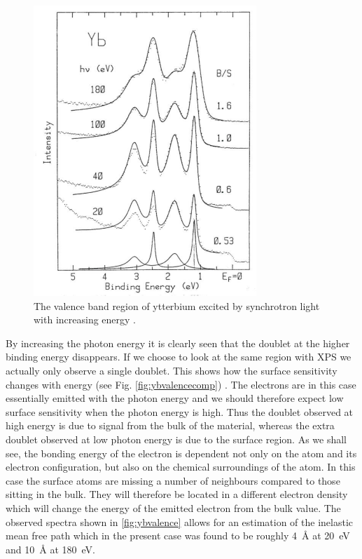 \begin{figure}[h!]
	\begin{center}
	\includegraphics[scale=4]{figures/04_12.png}
	\caption{The valence band region of ytterbium excited by synchrotron light with increasing energy \cite{gerken}.}
	\label{fig:ybvalence}
	\end{center}
\end{figure}

By increasing the photon energy it is clearly seen that the doublet at the higher binding energy disappears. If we choose to look at the same region with XPS we actually only observe a single doublet. This shows how the surface sensitivity changes with energy (see Fig. \ref{fig:ybvalencecomp}) \cite{gerken}. The electrons are in this case essentially emitted with the photon energy and we should therefore expect low surface sensitivity when the photon energy is high. Thus the doublet observed at high energy is due to signal from the bulk of the material, whereas the extra doublet observed at low photon energy is due to the surface region. As we shall see, the bonding energy of the electron is dependent not only on the atom and its electron configuration,  but  also  on  the chemical surroundings of the atom. In this case the surface atoms are missing a number of neighbours compared to those sitting in the bulk. They will therefore be located in a different electron density which will change the energy of the emitted electron  from the bulk value. The observed spectra shown in \autoref{fig:ybvalence} allows for an estimation of the inelastic mean free path which in the present case was found to be roughly \SI{4}{\angstrom} at \SI{20}{\electronvolt} and \SI{10}{\angstrom} at \SI{180}{\electronvolt}.


